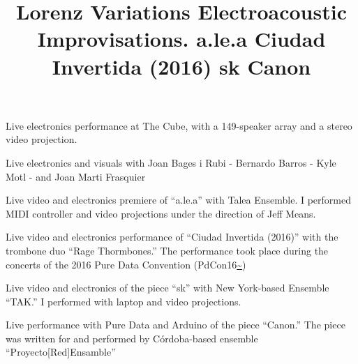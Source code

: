  \title{ Lorenz Variations}
 \begin{position}
{ Live electronics performance at The Cube, with a 149-speaker array and a stereo video projection.}
\end{position}

 \title{ Electroacoustic Improvisations.}
 \begin{position}
{ Live electronics and visuals with Joan Bages i Rubi - Bernardo Barros - Kyle Motl - and Joan Marti Frasquier}
\end{position}

 \title{ a.le.a}
 \begin{position}
{ Live video and electronics premiere of ``a.le.a'' with Talea Ensemble. I performed MIDI controller and video projections under the direction of Jeff Means. }
\end{position}

 \title{ Ciudad Invertida (2016) }
 \begin{position}
{ Live video and electronics performance of ``Ciudad Invertida (2016)'' with the trombone duo ``Rage Thormbones.'' The performance took place during the concerts of the 2016 Pure Data Convention (PdCon16\url{~}) }
\end{position}

 
 \title{ sk }
 \begin{position}
{ Live video and electronics of the piece ``sk'' with New York-based Ensemble ``TAK.'' I performed with laptop and video projections.}
\end{position}

 

 \title{ Canon}
 \begin{position}
{ Live performance with Pure Data and Arduino of the piece ``Canon.'' The piece was written for and performed by Córdoba-based ensemble ``Proyecto[Red]Ensamble'' } 
\end{position}
 

